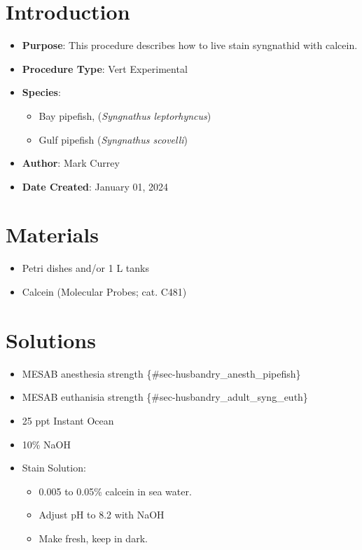 \documentclass[
  letterpaper,
  DIV=11,
  numbers=noendperiod]{scrreprt}
\providecommand{\tightlist}{%
  \setlength{\itemsep}{0pt}\setlength{\parskip}{0pt}}\usepackage{longtable,booktabs,array}
\begin{document}
\hypertarget{introduction-63}{%
\section{Introduction}\label{introduction-63}}

\begin{itemize}
\tightlist
\item
  \textbf{Purpose}: This procedure describes how to live stain
  syngnathid with calcein.
\item
  \textbf{Procedure Type}: Vert Experimental
\item
  \textbf{Species}:

  \begin{itemize}
  \tightlist
  \item
    Bay pipefish, (\emph{Syngnathus leptorhyncus})
  \item
    Gulf pipefish (\emph{Syngnathus scovelli})
  \end{itemize}
\item
  \textbf{Author}: Mark Currey
\item
  \textbf{Date Created}: January 01, 2024
\end{itemize}

\hypertarget{materials-58}{%
\section{Materials}\label{materials-58}}

\begin{itemize}
\tightlist
\item
  Petri dishes and/or 1 L tanks
\item
  Calcein (Molecular Probes; cat. C481)
\end{itemize}

\hypertarget{solutions-55}{%
\section{Solutions}\label{solutions-55}}

\begin{itemize}
\tightlist
\item
  MESAB anesthesia strength \{\#sec-husbandry\_anesth\_pipefish\}
\item
  MESAB euthanisia strength \{\#sec-husbandry\_adult\_syng\_euth\}
\item
  25 ppt Instant Ocean
\item
  10\% NaOH
\item
  Stain Solution:

  \begin{itemize}
  \tightlist
  \item
    0.005 to 0.05\% calcein in sea water.
  \item
    Adjust pH to 8.2 with NaOH
  \item
    Make fresh, keep in dark.
  \end{itemize}
\end{itemize}
\end{document}
